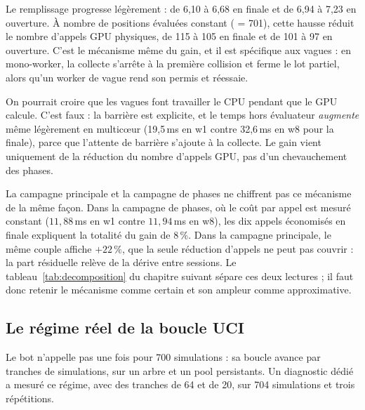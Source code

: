 Le remplissage progresse l\'eg\`erement : de 6,10 \`a 6,68 en finale et de
6,94 \`a 7,23 en ouverture. \`A nombre de positions \'evalu\'ees constant
( = 701), cette hausse r\'eduit le nombre d'appels GPU
physiques, de 115 \`a 105 en finale et de 101 \`a 97 en ouverture. C'est le
m\'ecanisme m\^eme du gain, et il est sp\'ecifique aux vagues : en
mono-worker, la collecte s'arr\^ete \`a la premi\`ere collision et ferme le lot
partiel, alors qu'un worker de vague rend son permis et r\'eessaie.

\begin{piege}
On pourrait croire que les vagues font travailler le CPU pendant que le GPU
calcule. C'est faux : la barri\`ere est explicite, et le temps hors
\'evaluateur \emph{augmente} m\^eme l\'eg\`erement en multic\oe{}ur
(19,5\,ms en w1 contre 32,6\,ms en w8 pour la finale), parce que l'attente de
barri\`ere s'ajoute \`a la collecte. Le gain vient uniquement de la
r\'eduction du nombre d'appels GPU, pas d'un chevauchement des phases.
\end{piege}

La campagne principale et la campagne de phases ne chiffrent pas ce m\'ecanisme
de la m\^eme fa\c{c}on. Dans la campagne de phases, o\`u le co\^ut par appel
est mesur\'e constant ($11{,}88$\,ms en w1 contre $11{,}94$\,ms en w8), les
dix appels \'economis\'es en finale expliquent la totalit\'e du gain de 8\,\%.
Dans la campagne principale, le m\^eme couple affiche $+22\,\%$, que la seule
r\'eduction d'appels ne peut pas couvrir : la part r\'esiduelle rel\`eve de la
d\'erive entre sessions. Le tableau~\ref{tab:decomposition} du chapitre
suivant s\'epare ces deux lectures ; il faut donc retenir le m\'ecanisme comme
certain et son ampleur comme approximative.

\subsection{Le r\'egime r\'eel de la boucle UCI}

Le bot n'appelle pas  une fois pour 700 simulations : sa
boucle avance par tranches de  simulations, sur un
arbre et un pool persistants. Un diagnostic d\'edi\'e a mesur\'e ce
r\'egime, avec des tranches de 64 et de 20, sur 704 simulations et trois
r\'ep\'etitions.

